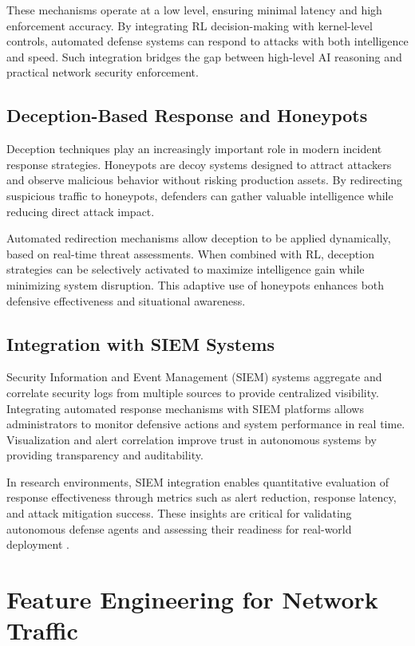 \documentclass[12pt,a4paper]{report}
\begin{document}
These mechanisms operate at a low level, ensuring minimal latency and high enforcement accuracy.
By integrating RL decision-making with kernel-level controls, automated defense systems can respond to attacks with both intelligence and speed.
Such integration bridges the gap between high-level AI reasoning and practical network security enforcement.

\subsection{Deception-Based Response and Honeypots}

Deception techniques play an increasingly important role in modern incident response strategies.
Honeypots are decoy systems designed to attract attackers and observe malicious behavior without risking production assets.
By redirecting suspicious traffic to honeypots, defenders can gather valuable intelligence while reducing direct attack impact.

Automated redirection mechanisms allow deception to be applied dynamically, based on real-time threat assessments.
When combined with RL, deception strategies can be selectively activated to maximize intelligence gain while minimizing system disruption.
This adaptive use of honeypots enhances both defensive effectiveness and situational awareness.

\subsection{Integration with SIEM Systems}

Security Information and Event Management (SIEM) systems aggregate and correlate security logs from multiple sources to provide centralized visibility.
Integrating automated response mechanisms with SIEM platforms allows administrators to monitor defensive actions and system performance in real time.
Visualization and alert correlation improve trust in autonomous systems by providing transparency and auditability.

In research environments, SIEM integration enables quantitative evaluation of response effectiveness through metrics such as alert reduction, response latency, and attack mitigation success.
These insights are critical for validating autonomous defense agents and assessing their readiness for real-world deployment \cite{ibmSOAR2023,honeypotSurvey2021}.

\section{Feature Engineering for Network Traffic}
\end{document}
